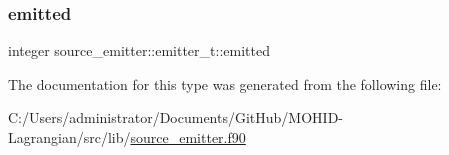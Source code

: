 \mbox{\label{structsource__emitter_1_1emitter__t_a30062afe1a31dcfd77c90762d8c8cb5c}} 
\subsubsection{\texorpdfstring{emitted}{emitted}}
{\footnotesize\ttfamily integer source\+\_\+emitter\+::emitter\+\_\+t\+::emitted\hspace{0.3cm}{\ttfamily [private]}}



The documentation for this type was generated from the following file\+:\begin{DoxyCompactItemize}
\item 
C\+:/\+Users/administrator/\+Documents/\+Git\+Hub/\+M\+O\+H\+I\+D-\/\+Lagrangian/src/lib/\mbox{\hyperlink{source__emitter_8f90}{source\+\_\+emitter.\+f90}}\end{DoxyCompactItemize}
